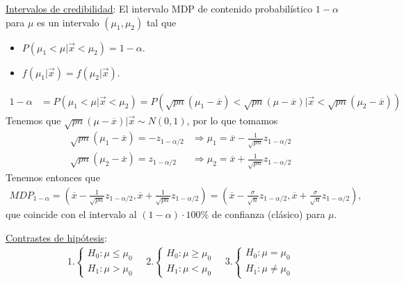 \underline{Intervalos de credibilidad}: El intervalo MDP de contenido probabilístico $1-\alpha$ para $\mu$ es un intervalo $(\mu_1,\mu_2)$ tal que
\begin{itemize}
    \item $P(\mu_1 < \mu | \vec{x} < \mu_2) = 1-\alpha$.
    \item $f(\mu_1| \vec{x}) = f(\mu_2 | \vec{x})$.
\end{itemize}
\begin{align*}
    1 - \alpha & = P(\mu_1 < \mu | \vec{x} < \mu_2) = P(\sqrt{pn}(\mu_1 - \overline{x}) < \sqrt{pn}(\mu - \overline{x}) | \vec{x} < \sqrt{pn}(\mu_2 - \overline{x}))
\end{align*}
Tenemos que $\sqrt{pn}(\mu - \overline{x}) | \vec{x} \sim N(0,1)$, por lo que tomamos
\begin{align*}
    \sqrt{pn}(\mu_1 - \overline{x}) = - z_{1 - \alpha/2} & \Longrightarrow \mu_1 = \overline{x} - \frac{1}{\sqrt{pn}}z_{1 - \alpha/2} \\
    \sqrt{pn}(\mu_2 - \overline{x}) = z_{1 - \alpha/2}   & \Longrightarrow \mu_2 = \overline{x} + \frac{1}{\sqrt{pn}}z_{1 - \alpha/2}
\end{align*}
Tenemos entonces que
\begin{align*}
    MDP_{1-\alpha} = \left( \overline{x}- \frac{1}{\sqrt{pn}}z_{1 - \alpha/2}, \overline{x} + \frac{1}{\sqrt{pn}}z_{1 - \alpha/2} \right) = \left( \overline{x}- \frac{\sigma}{\sqrt{n}}z_{1 - \alpha/2}, \overline{x} + \frac{\sigma}{\sqrt{n}}z_{1 - \alpha/2} \right),
\end{align*}
que coincide con el intervalo al $(1 - \alpha) \cdot 100 \%$ de confianza (clásico) para $\mu$.

\underline{Contrastes de hipótesis}:
\begin{align*}
    1. \begin{cases}
           H_0 : \mu \leq \mu_0 \\
           H_1 : \mu > \mu_0
       \end{cases} \quad     2.\begin{cases}
                                   H_0 : \mu \ge \mu_0 \\
                                   H_1 : \mu < \mu_0
                               \end{cases} \quad     3.\begin{cases}
                                                           H_0 : \mu = \mu_0 \\
                                                           H_1 : \mu \not = \mu_0
                                                       \end{cases}
\end{align*}

